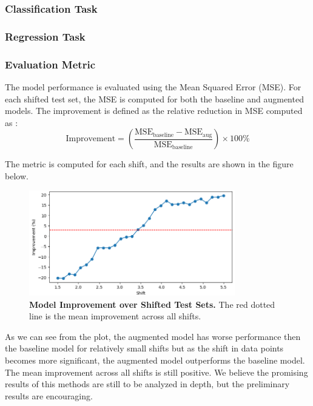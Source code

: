 \subsubsection{\textbf{Classification Task}}









\subsubsection{\textbf{Regression Task}}

\subsubsection{Evaluation Metric}
The model performance is evaluated using the Mean Squared Error (MSE). For each shifted test set, the MSE is computed for both the baseline and augmented models.
The improvement is defined as the relative reduction in MSE computed as :
\begin{equation}
    \text{Improvement} = \left(\frac{\text{MSE}_{\text{baseline}} - \text{MSE}_{\text{aug}}}{\text{MSE}_{\text{baseline}}}\right) \times 100\%
\end{equation}

The metric is computed for each shift, and the results are shown in the figure below.
\begin{figure}[H]
    \centering
    \includegraphics[width=0.8\textwidth]{assets/reg_exp_improvement.png} 
    \caption{\textbf{Model Improvement over Shifted Test Sets.} The red dotted line is the mean improvement across all shifts.}
    \label{fig:improv-plot}
\end{figure}

As we can see from the plot, the augmented model has worse performance then the baseline model for relatively small shifts but as the shift in data points becomes more significant, the augmented model outperforms the baseline model. The mean improvement across all shifts is still positive.
We believe the promising results of this methods are still to be analyzed in depth, but the preliminary results are encouraging.
